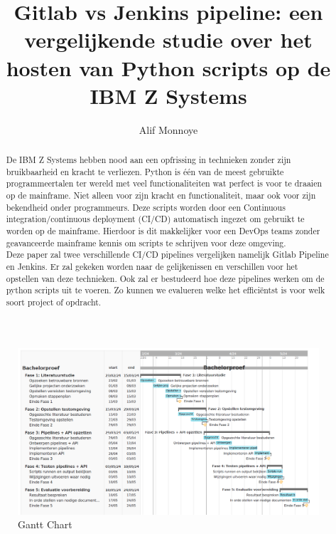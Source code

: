\documentclass{hogent-article}
\title{Gitlab vs Jenkins pipeline: een vergelijkende studie over het hosten van Python scripts op de IBM Z Systems}
\author{Alif Monnoye}
\begin{document}
\begin{abstract}
  De IBM Z Systems hebben nood aan een opfrissing in technieken zonder zijn bruikbaarheid en kracht te verliezen. Python is één van de meest gebruikte programmeertalen ter wereld met veel functionaliteiten wat perfect is voor te draaien op de mainframe. Niet alleen voor zijn kracht en functionaliteit, maar ook voor zijn bekendheid onder programmeurs. Deze scripts worden door een Continuous integration/continuous deployment (CI/CD) automatisch ingezet om gebruikt te worden op de mainframe. Hierdoor is dit makkelijker voor een DevOps teams zonder geavanceerde mainframe kennis om scripts te schrijven voor deze omgeving.   \\
  Deze paper zal twee verschillende CI/CD pipelines vergelijken namelijk Gitlab Pipeline en Jenkins. Er zal gekeken worden naar de gelijkenissen en verschillen voor het opstellen van deze technieken. Ook zal er bestudeerd hoe deze pipelines werken om de python scripts uit te voeren. Zo kunnen we evalueren welke het efficiëntst is voor welk soort project of opdracht.
\end{abstract}

\tableofcontents



\printbibliography[heading=bibintoc]

\cleardoublepage
\begin{figure}[pt!]
    \centering
    \includegraphics[width=550pt]{GanttChart.png}
    \caption{Gantt Chart}
    \label{fig}
\end{figure}
\end{document}
